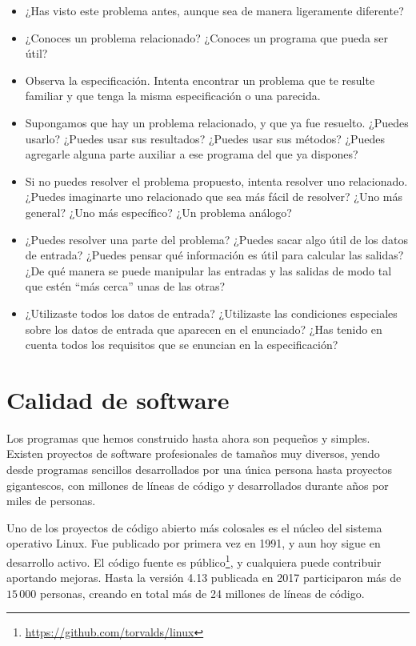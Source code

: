 \begin{itemize}
\item ¿Has visto este problema antes, aunque sea de manera
ligeramente diferente?

\item ¿Conoces un problema relacionado? ¿Conoces un programa que
pueda ser útil?

\item Observa la especificación. Intenta encontrar un
problema que te resulte familiar y que tenga la misma
especificación o una parecida.

\item Supongamos que hay un problema relacionado, y que ya fue
resuelto. ¿Puedes usarlo? ¿Puedes usar sus resultados?  ¿Puedes usar sus
métodos? ¿Puedes agregarle alguna parte auxiliar a ese programa del que ya
dispones?

\item Si no puedes resolver el problema propuesto, intenta
resolver uno relacionado. ¿Puedes imaginarte uno relacionado que
sea más fácil de resolver? ¿Uno más general? ¿Uno más específico?
¿Un problema análogo?

\item ¿Puedes resolver una parte del problema?  ¿Puedes sacar algo
útil de los datos de entrada? ¿Puedes pensar qué información es
útil para calcular las salidas? ¿De qué manera se puede manipular
las entradas y las salidas de modo tal que estén ``más cerca''
unas de las otras?

\item ¿Utilizaste todos los datos de entrada? ¿Utilizaste las condiciones
especiales sobre los datos de entrada que aparecen en el
enunciado? ¿Has tenido en cuenta todos los requisitos que se
enuncian en la especificación?

\end{itemize}

\section{Calidad de software}

Los programas que hemos construido hasta ahora son pequeños y simples. Existen
proyectos de software profesionales de tamaños muy diversos, yendo desde
programas sencillos desarrollados por una única persona hasta
proyectos gigantescos, con millones de líneas de código y desarrollados
durante años por miles de personas.

\begin{sabias_que}
Uno de los proyectos de código abierto más colosales es el núcleo
del sistema operativo Linux. Fue publicado por primera vez en 1991, y aun
hoy sigue en desarrollo activo. El código fuente es
público\footnote{\url{https://github.com/torvalds/linux}}, y cualquiera
puede contribuir aportando mejoras. Hasta la versión 4.13 publicada en 2017
participaron más de $15\,000$ personas, creando en total más de 24 millones de
líneas de código.
\end{sabias_que}

